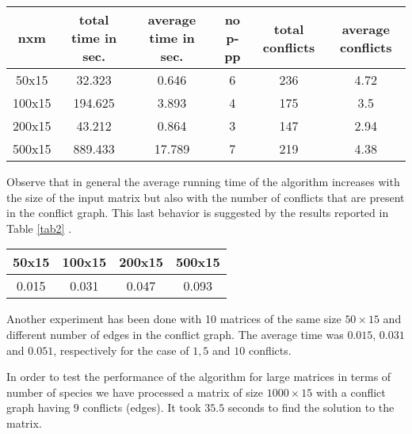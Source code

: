 \documentclass{llncs}
\begin{document}
\begin{table*}
\caption{Summary table}
\label{tab1}
\centering
\begin{scriptsize}
\begin{tabular}{|c|c|c|c|c|c|}
\hline
 {\bf nxm} & {\bf  total time in sec. } & {\bf average time in sec.} & {\bf no p-pp} & {\bf total conflicts} & {\bf average conflicts} \\
\hline
     50x15 &         32.323 &    0.646    &     6    &     236   & 4.72   \\
     100x15 &    194.625      &   3.893    &    4     &    175  & 3.5     \\
     200x15 &    43.212     &     0.864   &     3     &     147  & 2.94    \\
     500x15 &    889.433     &    17.789    &    7      &    219 & 4.38      \\
\hline
\end{tabular}
\end{scriptsize}
\end{table*}  


Observe that in general the average running time of the algorithm increases with the size of the input matrix but also with the number of conflicts   that are present in the conflict graph.
This last behavior is suggested  by the results reported in Table \ref{tab2} .


\begin{table*}
\caption{Average execution time in seconds to solve  $10$ matrices with a single conflict. }
\label{tab2}
\centering
\begin{scriptsize}
\begin{tabular}{|c|c|c|c|}
\hline
 {\bf 50x15} & {\bf 100x15} & {\bf 200x15} & {\bf 500x15} \\
\hline
0.015&	0.031&	0.047&	0.093 \\
\hline
\end{tabular}
\end{scriptsize}


\end{table*} 

Another experiment has been done with 10 matrices of the same size $50 \times 15$ and different number of edges in the conflict graph. The average time was  $0.015$,     $0.031$ and  $0.051$, respectively for the case of $1, 5$ and $10$ conflicts. 

In order to test the performance of the algorithm for large matrices in terms of number of species we have processed a matrix of size $1000 \times 15$ with a conflict graph having $9 $ conflicts (edges).  It took $35.5$ seconds to find the solution to the matrix.
\end{document}
